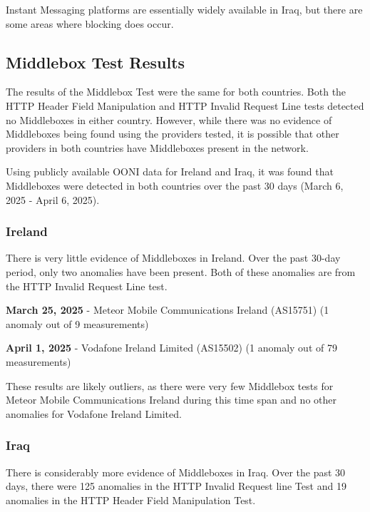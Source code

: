 Instant Messaging platforms are essentially widely available in Iraq, but there are some areas where blocking does occur.

\subsection{Middlebox Test Results}

The results of the Middlebox Test were the same for both countries. Both the HTTP Header Field Manipulation and HTTP Invalid Request Line tests detected no Middleboxes in either country. However, while there was no evidence of Middleboxes being found using the providers tested, it is possible that other providers in both countries have Middleboxes present in the network.

Using publicly available OONI data for Ireland and Iraq, it was found that Middleboxes were detected in both countries over the past 30 days (March 6, 2025 - April 6, 2025). 

\subsubsection{Ireland}

There is very little evidence of Middleboxes in Ireland. Over the past 30-day period, only two anomalies have been present. Both of these anomalies are from the HTTP Invalid Request Line test. 

\textbf{March 25, 2025} - Meteor Mobile Communications Ireland (AS15751) (1 anomaly out of 9 measurements)

\textbf{April 1, 2025} - Vodafone Ireland Limited (AS15502) (1 anomaly out of 79 measurements)

These results are likely outliers, as there were very few Middlebox tests for Meteor Mobile Communications Ireland during this time span and no other anomalies for Vodafone Ireland Limited.

\subsubsection{Iraq}

There is considerably more evidence of Middleboxes in Iraq. Over the past 30 days, there were 125 anomalies in the HTTP Invalid Request line Test and 19 anomalies in the HTTP Header Field Manipulation Test.

